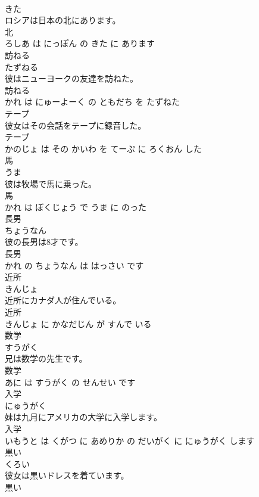 \documentclass[8pt]{extreport}
\begin{document}
\begin{CJK}{UTF8}{min}
\\	きた			
\\	ロシアは日本の北にあります。	
\\	北 
\\	ろしあ は にっぽん の きた に あります			
\\	訪ねる	
\\	たずねる			
\\	彼はニューヨークの友達を訪ねた。	
\\	訪ねる 
\\	かれ は にゅーよーく の ともだち を たずねた			
\\	テープ	
\\	彼女はその会話をテープに録音した。	
\\	テープ 
\\	かのじょ は その かいわ を てーぷ に ろくおん した			
\\	馬	
\\	うま			
\\	彼は牧場で馬に乗った。	
\\	馬 
\\	かれ は ぼくじょう で うま に のった			
\\	長男	
\\	ちょうなん			
\\	彼の長男は8才です。	
\\	長男 
\\	かれ の ちょうなん は はっさい です			
\\	近所	
\\	きんじょ			
\\	近所にカナダ人が住んでいる。	
\\	近所 
\\	きんじょ に かなだじん が すんで いる			
\\	数学	
\\	すうがく			
\\	兄は数学の先生です。	
\\	数学 
\\	あに は すうがく の せんせい です			
\\	入学	
\\	にゅうがく			
\\	妹は九月にアメリカの大学に入学します。	
\\	入学 
\\	いもうと は くがつ に あめりか の だいがく に にゅうがく します			
\\	黒い	
\\	くろい			
\\	彼女は黒いドレスを着ています。	
\\	黒い 

\end{CJK}
\end{document}
